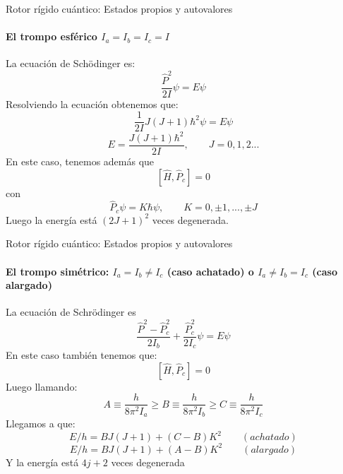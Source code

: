 \documentclass[a4paper]{beamer}
\begin{document}
\begin{frame}{Rotor rígido cuántico: Estados propios y autovalores}
\framesubtitle{El trompo esférico $I_a=I_b=I_c= I$}
La ecuación de Schödinger es:
\begin{equation*}
\frac{\hat P^2}{2I} \psi = E\psi
\end{equation*}
Resolviendo la ecuación obtenemos que:$$\frac{1}{2I}J(J+1)\hbar^2\psi=E\psi$$
\begin{equation*}
E=\frac{J(J+1)\hbar^2}{2I}, \qquad J=0,1,2...
\end{equation*}
En este caso, tenemos además que
\begin{equation*}
\left[\hat H,\hat P_c \right]=0
\end{equation*}
con $$\hat P_c \psi = K\hbar\psi, \qquad K = 0, \pm 1,..., \pm J$$
Luego la energía está $(2J+1)^2$ veces degenerada.
\end{frame}



\begin{frame}{Rotor rígido cuántico: Estados propios y autovalores}
\framesubtitle {El trompo simétrico: $I_a=I_b\neq I_c$ (caso achatado) o $I_a\neq I_b=I_c$ (caso alargado)}
La ecuación de Schrödinger es
\begin{equation*}
\frac{\hat P^2- \hat P_c^2}{2I_b}+\frac{\hat P_c^2}{2I_c}\psi=E\psi
\end{equation*}
En este caso también tenemos que:
\begin{equation*}
\left[\hat H,\hat P_c \right]=0
\end{equation*}
Luego llamando:
 \begin{equation*}
 A \equiv \frac{h}{8\pi^2I_a}\geq B\equiv \frac{h}{8\pi^2I_b}\geq C\equiv \frac{h}{8\pi^2I_c}
 \end{equation*}
 Llegamos a que:
 \begin{equation*}
 E/h=BJ\left(J+1\right)+\left(C-B\right)K^2 \qquad (achatado)
 \end{equation*}
 \begin{equation*}
 E/h=BJ\left(J+1\right)+\left(A-B\right)K^2 \qquad (alargado)
 \end{equation*}
 Y la energía está $4j+2$ veces degenerada
\end{frame}
\end{document}
